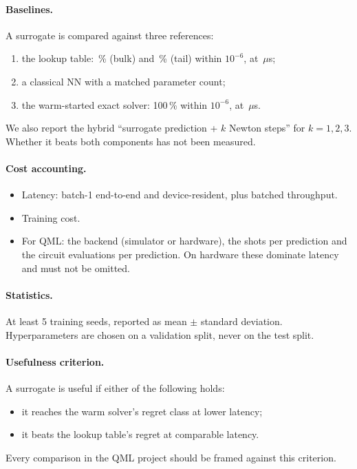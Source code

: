 \documentclass[11pt,a4paper]{article}
\begin{document}
\paragraph{Baselines.} A surrogate is compared against three references:
\begin{enumerate}
\item the lookup table: \QKDLimLookupPctWithin\,\% (bulk) and \QKDLimTailLookupPctWithin\,\% (tail) within
  $10^{-6}$, at \QKDLimLookupEndToEndUs\,$\mu$s;
\item a classical NN with a matched parameter count;
\item the warm-started exact solver: 100\,\% within $10^{-6}$, at \QKDLimWarmEndToEndUs\,$\mu$s.
\end{enumerate}
We also report the hybrid ``surrogate prediction + $k$ Newton steps'' for $k=1,2,3$. Whether it beats both
components has not been measured.

\paragraph{Cost accounting.}
\begin{itemize}
\item Latency: batch-1 end-to-end and device-resident, plus batched throughput.
\item Training cost.
\item For QML: the backend (simulator or hardware), the shots per prediction and the circuit evaluations per
  prediction. On hardware these dominate latency and must not be omitted.
\end{itemize}

\paragraph{Statistics.} At least 5 training seeds, reported as mean $\pm$ standard deviation. Hyperparameters are
chosen on a validation split, never on the test split.

\paragraph{Usefulness criterion.} A surrogate is useful if either of the following holds:
\begin{itemize}
\item it reaches the warm solver's regret class at lower latency;
\item it beats the lookup table's regret at comparable latency.
\end{itemize}
Every comparison in the QML project should be framed against this criterion.
\end{document}
